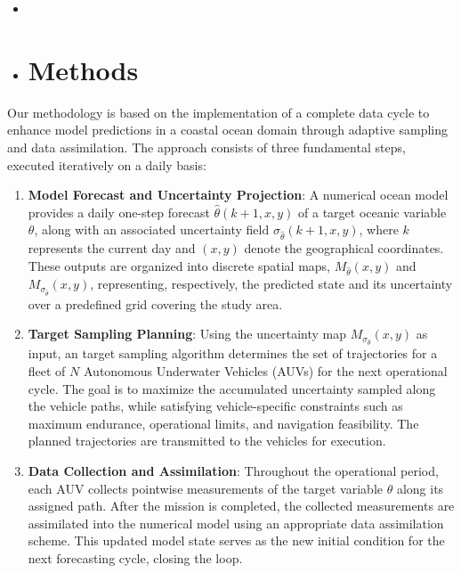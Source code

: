 \begin{itemize}
    \item 
    \item \section{Methods}
\end{itemize}

Our methodology is based on the implementation of a complete data cycle to enhance model predictions in a coastal ocean domain through adaptive sampling and data assimilation. The approach consists of three fundamental steps, executed iteratively on a daily basis:

\begin{enumerate}
    \item \textbf{Model Forecast and Uncertainty Projection}:  
    A numerical ocean model provides a daily one-step forecast $\hat{\theta}(k+1, x, y)$ of a target oceanic variable $\theta$, along with an associated uncertainty field $\sigma_{\hat{\theta}}(k+1, x, y)$, where $k$ represents the current day and $(x, y)$ denote the geographical coordinates. These outputs are organized into discrete spatial maps, $M_{\hat{\theta}}(x, y)$ and $M_{\sigma_{\hat{\theta}}}(x, y)$, representing, respectively, the predicted state and its uncertainty over a predefined grid covering the study area.
    
    \item \textbf{Target Sampling Planning}:  
    Using the uncertainty map $M_{\sigma_{\hat{\theta}}}(x, y)$ as input, an target sampling algorithm determines the set of trajectories for a fleet of $N$ Autonomous Underwater Vehicles (AUVs) for the next operational cycle. The goal is to maximize the accumulated uncertainty sampled along the vehicle paths, while satisfying vehicle-specific constraints such as maximum endurance, operational limits, and navigation feasibility. The planned trajectories are transmitted to the vehicles for execution.

    \item \textbf{Data Collection and Assimilation}:  
    Throughout the operational period, each AUV collects pointwise measurements of the target variable $\theta$ along its assigned path. After the mission is completed, the collected measurements are assimilated into the numerical model using an appropriate data assimilation scheme. This updated model state serves as the new initial condition for the next forecasting cycle, closing the loop.
\end{enumerate}

